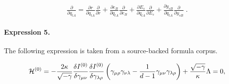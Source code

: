 \documentclass[11pt]{article}
\begin{document}
\begin{align*}\frac{\partial}{\partial q_{tA}}=\frac{\partial r}{\partial q_{tA}}\frac{\partial}{\partial r}+\frac{\partial e_B}{\partial q_{tA}}\frac{\partial}{\partial e_B}+\frac{\partial E_s}{\partial q_{tA}}\frac{\partial}{\partial E_s}+\frac{\partial y_{sB}}{\partial q_{tA}}\frac{\partial}{\partial y_{sB}}\;.\end{align*}

\paragraph{Expression 5.} The following expression is taken from a source-backed formula corpus.

\begin{align*}{\cal H}^{(0)} = -\frac{2 \kappa}{\sqrt{-\gamma}}\frac{\delta I^{(0)}}{\delta \gamma_{\mu \nu}}\frac{\delta I^{(0)}}{\delta \gamma_{\lambda \rho}}\left( \gamma_{\mu \rho} \gamma_{\nu \lambda}-\frac{1}{d-1} \gamma_{\mu \nu } \gamma_{\lambda \rho} \right)+ \frac{\sqrt{-\gamma}}{\kappa} \Lambda=0,\end{align*}
\end{document}
